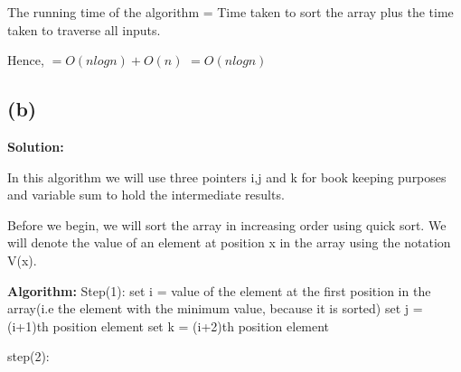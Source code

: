 \documentclass[12pt]{article}
\begin{document}
The running time of the algorithm  = Time taken to sort the array plus the time taken to traverse all inputs.

Hence,
$=O(nlogn)+O(n)$
$=O(nlogn)$

\subsection{(b)}
\textbf{Solution:}

In this algorithm we will use three pointers i,j and k for book keeping purposes and variable sum to hold the intermediate results. 

Before we begin, we will sort the array in increasing order using quick sort. 
We will denote the value of an element at position x in the array using the notation V(x).

\textbf{Algorithm: }
Step(1):
set i = value of the element at the first position in the array(i.e the element with the minimum value, because it is sorted)
set j = (i+1)th position element
set k = (i+2)th position element

step(2):
\end{document}
